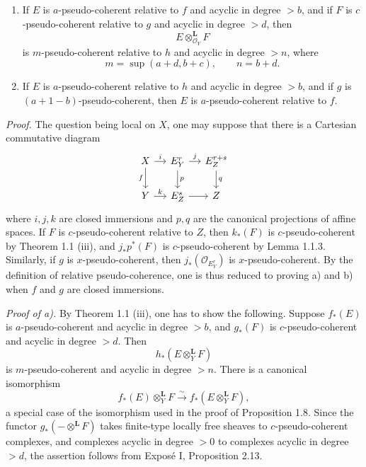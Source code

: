 \begin{enumerate}[label=\alph*)]
\item If \(E\) is \(a\)-pseudo-coherent relative to \(f\) and acyclic in degree \(>b\), and if \(F\) is \(c\)-pseudo-coherent relative to \(g\) and acyclic in degree \(>d\), then
\[
  E\otimes_{\mathcal O_Y}^{\mathbf L}F
\]
is \(m\)-pseudo-coherent relative to \(h\) and acyclic in degree \(>n\), where
\[
  m=\sup(a+d,b+c),\qquad n=b+d.
\]

\item If \(E\) is \(a\)-pseudo-coherent relative to \(h\) and acyclic in degree \(>b\), and if \(g\) is \((a+1-b)\)-pseudo-coherent, then \(E\) is \(a\)-pseudo-coherent relative to \(f\).
\end{enumerate}

\emph{Proof.} The question being local on \(X\), one may suppose that there is a Cartesian commutative diagram
\[
\begin{tikzcd}[column sep=small]
X \arrow[r,"i"] \arrow[d,"f"'] & E^r_Y \arrow[r,"j"] \arrow[d,"p"] & E^{r+s}_Z \arrow[d,"q"]\\
Y \arrow[r,"k"] & E^s_Z \arrow[r] & Z
\end{tikzcd}
\]
where \(i,j,k\) are closed immersions and \(p,q\) are the canonical projections of affine spaces. If \(F\) is \(c\)-pseudo-coherent relative to \(Z\), then \(k_*(F)\) is \(c\)-pseudo-coherent by Theorem 1.1 (iii), and \(j_*p^*(F)\) is \(c\)-pseudo-coherent by Lemma 1.1.3. Similarly, if \(g\) is \(x\)-pseudo-coherent, then \(j_*(\mathcal O_{E^r_Y})\) is \(x\)-pseudo-coherent. By the definition of relative pseudo-coherence, one is thus reduced to proving a) and b) when \(f\) and \(g\) are closed immersions.

\emph{Proof of a).} By Theorem 1.1 (iii), one has to show the following. Suppose \(f_*(E)\) is \(a\)-pseudo-coherent and acyclic in degree \(>b\), and \(g_*(F)\) is \(c\)-pseudo-coherent and acyclic in degree \(>d\). Then
\[
  h_*(E\otimes_Y^{\mathbf L}F)
\]
is \(m\)-pseudo-coherent and acyclic in degree \(>n\). There is a canonical isomorphism
\[
  f_*(E)\otimes_Y^{\mathbf L}F\xrightarrow{\sim} f_*(E\otimes_Y^{\mathbf L}F),
\]
a special case of the isomorphism used in the proof of Proposition 1.8. Since the functor \(g_*(-\otimes^{\mathbf L}F)\) takes finite-type locally free sheaves to \(c\)-pseudo-coherent complexes, and complexes acyclic in degree \(>0\) to complexes acyclic in degree \(>d\), the assertion follows from Exposé I, Proposition 2.13.

